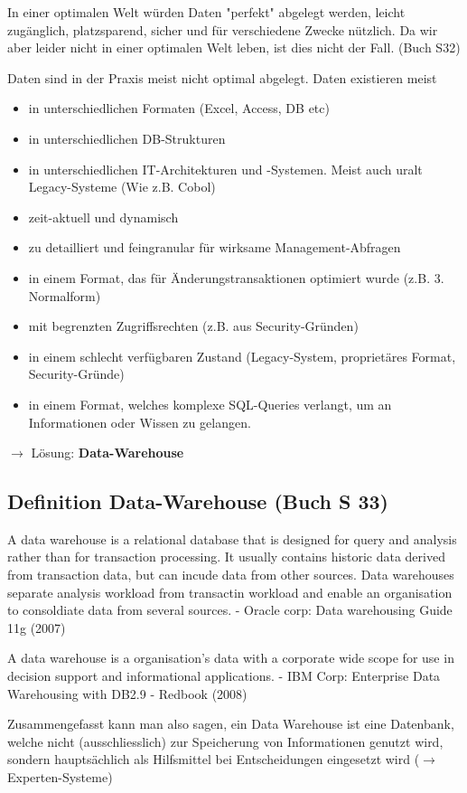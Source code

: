 \documentclass[a4paper, 11pt]{article}
\begin{document}
In einer optimalen Welt würden Daten "perfekt" abgelegt werden, leicht zugänglich, platzsparend, sicher und für verschiedene Zwecke nützlich. Da wir aber leider nicht in einer optimalen Welt leben, ist dies nicht der Fall. (Buch S32)

Daten sind in der Praxis meist nicht optimal abgelegt. Daten existieren meist
\begin{itemize}
	\item in unterschiedlichen Formaten (Excel, Access, DB etc)
	\item in unterschiedlichen DB-Strukturen 
	\item in unterschiedlichen IT-Architekturen und -Systemen. Meist auch uralt Legacy-Systeme (Wie z.B. Cobol)
	\item zeit-aktuell und dynamisch
	\item zu detailliert und feingranular für wirksame Management-Abfragen
	\item in einem Format, das für Änderungstransaktionen optimiert wurde (z.B. 3. Normalform)
	\item mit begrenzten Zugriffsrechten (z.B. aus Security-Gründen)
	\item in einem schlecht verfügbaren Zustand (Legacy-System, proprietäres Format, Security-Gründe)
	\item in einem Format, welches komplexe SQL-Queries verlangt, um an Informationen oder Wissen zu gelangen.
\end{itemize}

$\rightarrow$ Lösung: \textbf{Data-Warehouse}

\subsection{Definition Data-Warehouse (Buch S 33)}

A data warehouse is a relational database that is designed for query and analysis rather than for transaction processing. It usually contains historic data derived from transaction data, but can incude data from other sources. Data warehouses separate analysis workload from transactin workload and enable an organisation to consoldiate data from several sources. - Oracle corp: Data warehousing Guide 11g (2007) 

A data warehouse is a organisation's data with a corporate wide scope for use in decision support and informational applications. - IBM Corp: Enterprise Data Warehousing with DB2.9 - Redbook (2008)

Zusammengefasst kann man also sagen, ein Data Warehouse ist eine Datenbank, welche nicht (ausschliesslich) zur Speicherung von Informationen genutzt wird, sondern hauptsächlich als Hilfsmittel bei Entscheidungen eingesetzt wird ($\rightarrow$ Experten-Systeme)
\end{document}
